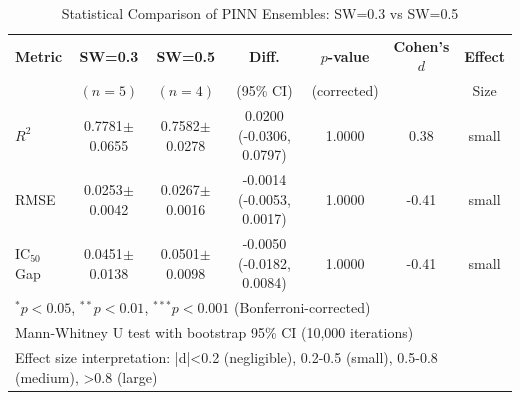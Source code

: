 \begin{table}[htbp]
\centering
\caption{Statistical Comparison of PINN Ensembles: SW=0.3 vs SW=0.5}
\label{tab:ensemble_comparison}
\begin{tabular}{lcccccc}
\hline
\textbf{Metric} & \textbf{SW=0.3} & \textbf{SW=0.5} & \textbf{Diff.} & \textbf{$p$-value} & \textbf{Cohen's $d$} & \textbf{Effect} \\
                & $(n=5)$         & $(n=4)$         & (95\% CI)      & (corrected)        &                     & Size \\
\hline
$R^2$ & 0.7781$\pm$0.0655 & 0.7582$\pm$0.0278 & 0.0200 (-0.0306, 0.0797) & 1.0000 & 0.38 & small \\
RMSE & 0.0253$\pm$0.0042 & 0.0267$\pm$0.0016 & -0.0014 (-0.0053, 0.0017) & 1.0000 & -0.41 & small \\
IC$_{50}$ Gap & 0.0451$\pm$0.0138 & 0.0501$\pm$0.0098 & -0.0050 (-0.0182, 0.0084) & 1.0000 & -0.41 & small \\
\hline
\multicolumn{7}{l}{\small $^*p<0.05$, $^{**}p<0.01$, $^{***}p<0.001$ (Bonferroni-corrected)} \\
\multicolumn{7}{l}{\small Mann-Whitney U test with bootstrap 95\% CI (10,000 iterations)} \\
\multicolumn{7}{l}{\small Effect size interpretation: |d|<0.2 (negligible), 0.2-0.5 (small), 0.5-0.8 (medium), >0.8 (large)} \\
\end{tabular}
\end{table}
